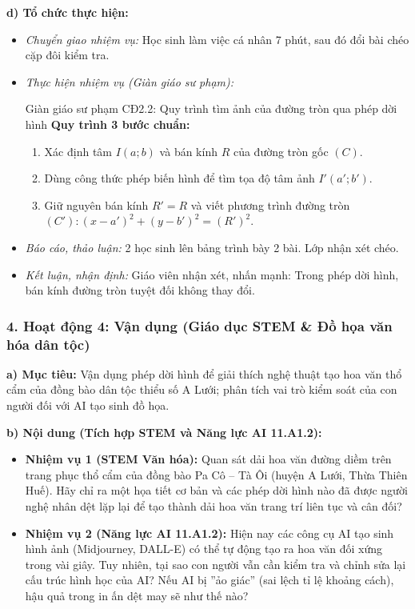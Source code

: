 \documentclass[12pt, a4paper]{article}
\begin{document}
\textbf{d) Tổ chức thực hiện:}
\begin{itemize}[leftmargin=0.6cm]
    \item \textit{Chuyển giao nhiệm vụ:} Học sinh làm việc cá nhân 7 phút, sau đó đổi bài chéo cặp đôi kiểm tra.
    \item \textit{Thực hiện nhiệm vụ (Giàn giáo sư phạm):}
    \begin{scaffoldbox}{Giàn giáo sư phạm CĐ2.2: Quy trình tìm ảnh của đường tròn qua phép dời hình}
        \textbf{Quy trình 3 bước chuẩn:}
        \begin{enumerate}[leftmargin=0.5cm]
            \item Xác định tâm $I(a; b)$ và bán kính $R$ của đường tròn gốc $(C)$.
            \item Dùng công thức phép biến hình để tìm tọa độ tâm ảnh $I'(a'; b')$.
            \item Giữ nguyên bán kính $R' = R$ và viết phương trình đường tròn $(C'): (x - a')^2 + (y - b')^2 = (R')^2$.
        \end{enumerate}
    \end{scaffoldbox}
    \item \textit{Báo cáo, thảo luận:} 2 học sinh lên bảng trình bày 2 bài. Lớp nhận xét chéo.
    \item \textit{Kết luận, nhận định:} Giáo viên nhận xét, nhấn mạnh: Trong phép dời hình, bán kính đường tròn tuyệt đối không thay đổi.
\end{itemize}

\subsubsection*{4. Hoạt động 4: Vận dụng (Giáo dục STEM \& Đồ họa văn hóa dân tộc)}
\textbf{a) Mục tiêu:} Vận dụng phép dời hình để giải thích nghệ thuật tạo hoa văn thổ cẩm của đồng bào dân tộc thiểu số A Lưới; phân tích vai trò kiểm soát của con người đối với AI tạo sinh đồ họa.

\textbf{b) Nội dung (Tích hợp STEM và Năng lực AI 11.A1.2):}
\begin{itemize}[leftmargin=0.6cm]
    \item \textbf{Nhiệm vụ 1 (STEM Văn hóa):} Quan sát dải hoa văn đường diềm trên trang phục thổ cẩm của đồng bào Pa Cô -- Tà Ôi (huyện A Lưới, Thừa Thiên Huế). Hãy chỉ ra một họa tiết cơ bản và các phép dời hình nào đã được người nghệ nhân dệt lặp lại để tạo thành dải hoa văn trang trí liên tục và cân đối?
    \item \textbf{Nhiệm vụ 2 (Năng lực AI 11.A1.2):} Hiện nay các công cụ AI tạo sinh hình ảnh (Midjourney, DALL-E) có thể tự động tạo ra hoa văn đối xứng trong vài giây. Tuy nhiên, tại sao con người vẫn cần kiểm tra và chỉnh sửa lại cấu trúc hình học của AI? Nếu AI bị ''ảo giác'' (sai lệch tỉ lệ khoảng cách), hậu quả trong in ấn dệt may sẽ như thế nào?
\end{itemize}
\end{document}
